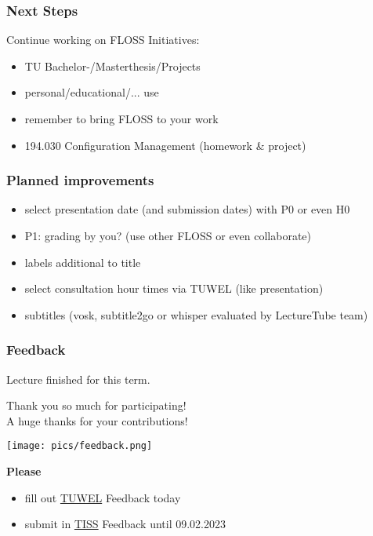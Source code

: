 \begin{frame}
	\frametitle{Next Steps}

	Continue working on FLOSS Initiatives:

	\begin{itemize}[<+-| alert@+>]
	\item TU Bachelor-/Masterthesis/Projects
	\item personal/educational/... use
	\item remember to bring FLOSS to your work
	\item 194.030 Configuration Management (homework \& project)
	\end{itemize}
\end{frame}

\begin{frame}
	\frametitle{Planned improvements}

	\begin{itemize}[<+-| alert@+>]
		\item select presentation date (and submission dates) with P0 or even H0
		\item P1: grading by you? (use other FLOSS or even collaborate)
		\item labels additional to title
		\item select consultation hour times via TUWEL (like presentation)
		\item subtitles (vosk, subtitle2go or whisper evaluated by LectureTube team)
	\end{itemize}
\end{frame}

\begin{frame}
	\frametitle{Feedback}
	Lecture finished for this term.

	Thank you so much for participating! \\
	A huge thanks for your contributions!

	\hfill \texttt{[image: pics/feedback.png]}
	\vspace{-1cm}

	\textbf{Please}
	\begin{itemize}
		\item fill out \href{https://tuwel.tuwien.ac.at/mod/feedback/view.php?id=1661074}{TUWEL} Feedback today
		\item submit in \href{https://tiss.tuwien.ac.at/survey/surveyForm.xhtml?courseNumber=194114&semesterCode=2022W}{TISS} Feedback until 09.02.2023
	\end{itemize}
\end{frame}

%
%	
%	



